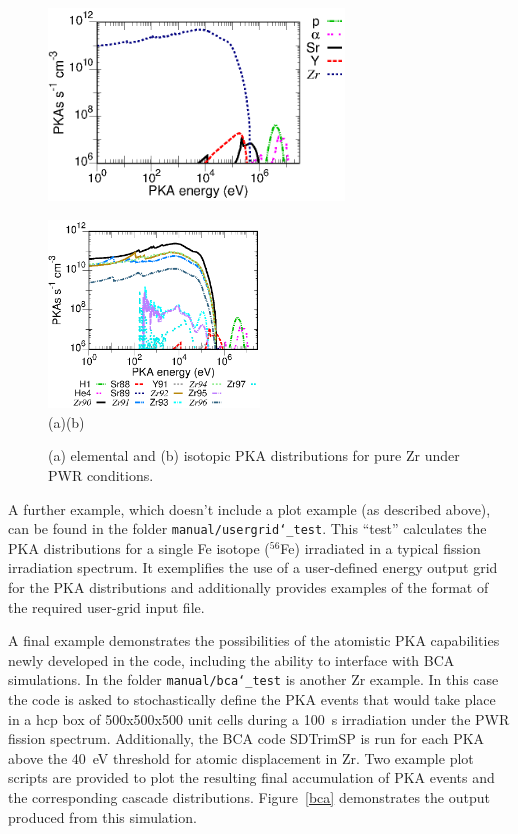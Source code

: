 \documentclass[a4paper]{article}
\begin{document}
\begin{figure}[t]
\hskip-1.5cm
\parbox[b][7cm][t]{0.7\textwidth}{\includegraphics[width=0.7\textwidth]
{figures/ZR_elemental}}%
\includegraphics[width=0.5\textwidth]
{figures/ZR_isotope}\\
\vskip-1.0cm
\hskip-0.5cm(a)\hskip7.2cm(b)
\caption{\label{pka_graphs}(a) elemental and (b) isotopic PKA distributions for pure Zr under PWR conditions.}
\end{figure}

A further example, which doesn't include a plot example (as described above), can be found in the folder \texttt{manual/usergrid\char`_test}. This ``test'' calculates the PKA distributions for a single Fe isotope (\(^{56}\)Fe) irradiated in a typical fission irradiation spectrum. It exemplifies the use of a user-defined energy output grid for the PKA distributions and additionally provides examples of the format of the required user-grid input file.

A final example demonstrates the possibilities of the atomistic PKA capabilities newly developed in the code, including the ability to interface with BCA simulations. In the folder   \texttt{manual/bca\char`_test} is another Zr example. In this case the code is asked to stochastically define the PKA events that would take place in a hcp box of 500x500x500 unit cells during a 100~s irradiation under the PWR fission spectrum. Additionally, the BCA code SDTrimSP is run for each PKA above the 40~eV threshold for atomic displacement in Zr. Two example plot scripts are provided to plot the resulting final accumulation of PKA events and the corresponding cascade distributions. Figure~\ref{bca} demonstrates the output produced from this simulation. 
\end{document}
